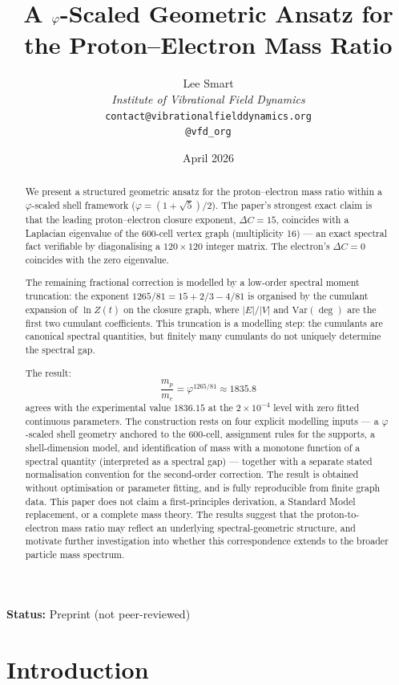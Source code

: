 \documentclass[12pt]{article}
\title{A $\phig$-Scaled Geometric Ansatz for the Proton--Electron Mass Ratio}
\author{%
  Lee Smart\\[4pt]
  \textit{Institute of Vibrational Field Dynamics}\\[2pt]
  \texttt{contact@vibrationalfielddynamics.org}\\[2pt]
  \texttt{@vfd\_org}%
}
\date{April 2026}
\newcommand{\phig}{\varphi}
\begin{document}
\maketitle

\noindent\textbf{Status:} Preprint (not peer-reviewed)

\begin{abstract}
We present a structured geometric ansatz for the proton--electron mass ratio within a $\phig$-scaled shell framework ($\phig = (1+\sqrt{5})/2$). The paper's strongest exact claim is that the leading proton--electron closure exponent, $\Delta C = 15$, coincides with a Laplacian eigenvalue of the 600-cell vertex graph (multiplicity 16) --- an exact spectral fact verifiable by diagonalising a $120 \times 120$ integer matrix. The electron's $\Delta C = 0$ coincides with the zero eigenvalue.

The remaining fractional correction is modelled by a low-order spectral moment truncation: the exponent $1265/81 = 15 + 2/3 - 4/81$ is organised by the cumulant expansion of $\ln Z(t)$ on the closure graph, where $|E|/|V|$ and $\mathrm{Var}(\deg)$ are the first two cumulant coefficients. This truncation is a modelling step: the cumulants are canonical spectral quantities, but finitely many cumulants do not uniquely determine the spectral gap.

The result:
\[
\frac{m_p}{m_e} = \phig^{1265/81} \approx 1835.8
\]
agrees with the experimental value $1836.15$ at the $2 \times 10^{-4}$ level with zero fitted continuous parameters. The construction rests on four explicit modelling inputs --- a $\phig$-scaled shell geometry anchored to the 600-cell, assignment rules for the supports, a shell-dimension model, and identification of mass with a monotone function of a spectral quantity (interpreted as a spectral gap) --- together with a separate stated normalisation convention for the second-order correction. The result is obtained without optimisation or parameter fitting, and is fully reproducible from finite graph data. This paper does not claim a first-principles derivation, a Standard Model replacement, or a complete mass theory. The results suggest that the proton-to-electron mass ratio may reflect an underlying spectral-geometric structure, and motivate further investigation into whether this correspondence extends to the broader particle mass spectrum.
\end{abstract}

\section{Introduction}\label{sec:intro}
\end{document}
